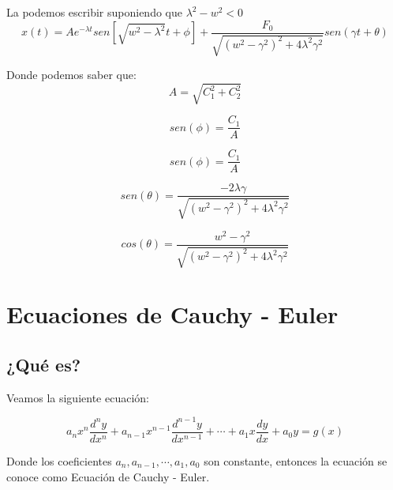 \documentclass[12pt]{article}							    %
\begin{document}
La podemos escribir suponiendo que $\lambda ^2 - w^2 < 0$
\begin{equation*}
	x(t) = A e^{-\lambda t} sen\left[ \sqrt{w^2-\lambda^2} t + \phi \right] + \frac{F_0}{\sqrt{(w^2-\gamma^2)^2 + 4\lambda^2 \gamma^2} } sen(\gamma t + \theta)
\end{equation*}

Donde podemos saber que:
\begin{equation*}
	A = \sqrt{C_1^2 + C_2^2}
\end{equation*}

\begin{equation*}
	sen(\phi) = \frac{C_1}{A}
\end{equation*}

\begin{equation*}
	sen(\phi) = \frac{C_1}{A}
\end{equation*}

\begin{equation*}
	sen(\theta) = \frac{-2\lambda \gamma}{\sqrt{(w^2-\gamma^2)^2 +4\lambda^2\gamma^2 }}
\end{equation*}

\begin{equation*}
	cos(\theta) = \frac{w^2 - \gamma^2}{\sqrt{(w^2-\gamma^2)^2 +4\lambda^2\gamma^2 }}
\end{equation*}




	\clearpage
	\section{Ecuaciones de Cauchy - Euler}

		\subsection{¿Qué es?}
		Veamos la siguiente ecuación:

		\begin{equation}
			a_n x^n \frac{d^n y}{dx^n} + a_{n-1} x^{n-1} \frac{d^{n-1} y}{dx^{n-1}} + \cdots + a_1 x \frac{dy}{dx} + a_0 y = g(x)
		\end{equation}

		Donde los coeficientes $a_n, a_{n-1}, \cdots , a_1, a_0$ son constante, entonces la ecuación se conoce como Ecuación de Cauchy - Euler.
\end{document}
